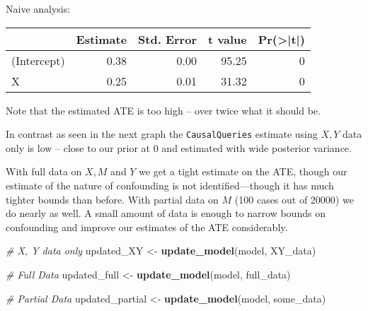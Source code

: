 \documentclass[
  12pt,
]{book}
\newenvironment{Shaded}{\begin{snugshade}}{\end{snugshade}}
\newcommand{\AttributeTok}[1]{\textcolor[rgb]{0.13,0.29,0.53}{#1}}
\newcommand{\CommentTok}[1]{\textcolor[rgb]{0.56,0.35,0.01}{\textit{#1}}}
\newcommand{\DecValTok}[1]{\textcolor[rgb]{0.00,0.00,0.81}{#1}}
\newcommand{\FunctionTok}[1]{\textcolor[rgb]{0.13,0.29,0.53}{\textbf{#1}}}
\newcommand{\NormalTok}[1]{#1}
\newcommand{\OtherTok}[1]{\textcolor[rgb]{0.56,0.35,0.01}{#1}}
\newcommand{\SpecialCharTok}[1]{\textcolor[rgb]{0.81,0.36,0.00}{\textbf{#1}}}
\begin{document}
Naive analysis:

\begin{Shaded}
\end{Shaded}

\begin{tabular}{l|r|r|r|r}
\hline
  & Estimate & Std. Error & t value & Pr(>|t|)\\
\hline
(Intercept) & 0.38 & 0.00 & 95.25 & 0\\
\hline
X & 0.25 & 0.01 & 31.32 & 0\\
\hline
\end{tabular}

Note that the estimated ATE is too high -- over twice what it should be.

In contrast as seen in the next graph the \texttt{CausalQueries} estimate using \(X,Y\) data only is low -- close to our prior at 0 and estimated with wide posterior variance.

With full data on \(X, M\) and \(Y\) we get a tight estimate on the ATE, though our estimate of the nature of confounding is not identified---though it has much tighter bounds than before. With partial data on \(M\) (100 cases out of 20000) we do nearly as well. A small amount of data is enough to narrow bounds on confounding and improve our estimates of the ATE considerably.

\begin{Shaded}
\begin{Highlighting}[]
\CommentTok{\# X, Y data only}
\NormalTok{updated\_XY      }\OtherTok{\textless{}{-}} \FunctionTok{update\_model}\NormalTok{(model, XY\_data)}

\CommentTok{\# Full Data}
\NormalTok{updated\_full    }\OtherTok{\textless{}{-}} \FunctionTok{update\_model}\NormalTok{(model, full\_data)}

\CommentTok{\# Partial Data}
\NormalTok{updated\_partial }\OtherTok{\textless{}{-}} \FunctionTok{update\_model}\NormalTok{(model, some\_data)}
\end{Highlighting}
\end{Shaded}
\end{document}
